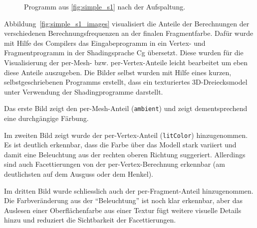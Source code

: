 \documentclass[twoside,a4paper,fleqn,12pt]{book}
\begin{document}
\begin{figure}[h!t]
  \centering
  
  \caption{Programm aus \ref{fig:simple_s1} nach der Aufspaltung.}
  \label{fig:simple_s1_split}
\end{figure}

Abbildung~\ref{fig:simple_s1_images} visualisiert die Anteile der Berechnungen der verschiedenen Berechnungsfrequenzen
an der finalen Fragmentfarbe. Dafür wurde mit Hilfe des Compilers das Eingabeprogramm in ein Vertex- und Fragmentprogramm
in der Shadingsprache Cg übersetzt. Diese wurden für die Visualisierung der per-Mesh- bzw. per-Vertex-Anteile leicht bearbeitet
um eben diese Anteile auszugeben. Die Bilder selbst wurden mit Hilfe eines kurzen, selbstgeschriebenen Programms erstellt,
dass ein texturiertes 3D-Dreiecksmodel unter Verwendung der Shadingprogramme darstellt.

Das erste Bild zeigt den per-Mesh-Anteil (\texttt{ambient}) und zeigt dementsprechend eine durchgängige Färbung.

Im zweiten Bild zeigt wurde der per-Vertex-Anteil (\texttt{litColor}) hinzugenommen. Es ist deutlich erkennbar,
dass die Farbe über das Modell stark variiert und damit eine Beleuchtung aus der rechten oberen Richtung suggeriert.
Allerdings sind auch Facettierungen von der per-Vertex-Berechnung erkennbar (am deutlichsten auf dem Ausguss oder dem Henkel).

Im dritten Bild wurde schliesslich auch der per-Fragment-Anteil hinzugenommen. Die Farbveränderung aus der "`Beleuchtung"'
ist noch klar erkennbar, aber das Auslesen einer Oberflächenfarbe aus einer Textur fügt weitere visuelle Details hinzu
und reduziert die Sichtbarkeit der Facettierungen.
\end{document}
